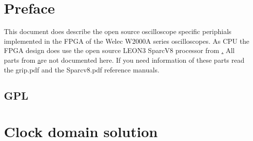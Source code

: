 \documentclass[11pt,ngerman,american,a4paper,dvipdfm]{paper}
\begin{document}

%		


%
%
%
%

\section {Preface}
This document does describe the open source oscilloscope specific periphials implemented in the FPGA of the Welec W2000A series oscilloscopes.
As CPU the FPGA design does use the open source LEON3 SparcV8 processor from \href{www.gaisler.com}.
All parts from \href{www.gaisler.com} are not documented here. If you need information of these parts read the grip.pdf and the Sparcv8.pdf reference manuals.
\subsection{GPL}
 
\section{Clock domain solution}
\end{document}
